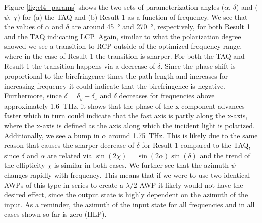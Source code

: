 Figure \ref{fig:cl4_params} shows the two sets of parameterization angles ($\alpha$, $\delta$) and ($\psi$, $\chi$) for (a) the TAQ and (b) Result 1 as a function of frequency. We see that the values of $\alpha$ and $\delta$ are around \SI{45}{\degree} and \SI{270}{\degree}, respectively, for both Result 1 and the TAQ indicating LCP. Again, similar to what the polarization degree showed we see a transition to RCP outside of the optimized frequency range, where in the case of Result 1 the transition is sharper. For both the TAQ and Result 1 the transition happens via a decrease of $\delta$. Since the phase shift is proportional to the birefringence times the path length and increases for increasing frequency it could indicate that the birefringence is negative. Furthermore, since $\delta = \delta_y - \delta_x$ and $\delta$ decreases for frequencies above approximately \SI{1.6}{\tera \hertz}, it shows that the phase of the x-component advances faster which in turn could indicate that the fast axis is partly along the x-axis, where the x-axis is defined as the axis along which the incident light is polarized. Additionally, we see a bump in $\alpha$ around \SI{1.75}{\tera \hertz}. This is likely due to the same reason that causes the sharper decrease of $\delta$ for Result 1 compared to the TAQ, since $\delta$ and $\alpha$ are related via $\sin(2\chi)=\sin(2\alpha)\sin(\delta)$ and the trend of the ellipticity $\chi$ is similar in both cases. We further see that the azimuth $\psi$ changes rapidly with frequency. This means that if we were to use two identical AWPs of this type in series to create a $\lambda/2$ AWP it likely would not have the desired effect, since the output state is highly dependent on the azimuth of the input. As a reminder, the azimuth of the input state for all frequencies and in all cases shown so far is zero (HLP).

